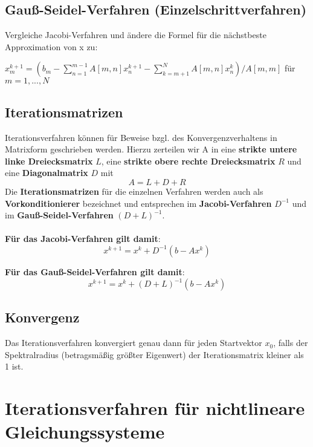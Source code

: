 \documentclass[10pt,a4paper]{article}
\begin{document}
	\subsection{Gauß-Seidel-Verfahren (Einzelschrittverfahren)}
	Vergleiche Jacobi-Verfahren und ändere die Formel für die nächstbeste Approximation von x zu:
	\begin{center}
		$x^{k+1}_m = (b_m - \sum_{n = 1}^{m - 1}A[m, n]x^{k+1}_n - \sum_{k = m + 1}^{N}A[m, n]x_n^k) / A[m, m]$ für $m = 1, ..., N$
	\end{center}
	
	\subsection{Iterationsmatrizen}
	Iterationsverfahren können für Beweise bzgl. des Konvergenzverhaltens in Matrixform geschrieben werden. Hierzu zerteilen wir A in eine \textbf{strikte untere linke Dreiecksmatrix} $L$, eine \textbf{strikte obere rechte Dreiecksmatrix} $R$ und eine \textbf{Diagonalmatrix} $D$ mit $$A = L + D + R$$
	Die \textbf{Iterationsmatrizen} für die einzelnen Verfahren werden auch als \textbf{Vorkonditionierer} bezeichnet und entsprechen im \textbf{Jacobi-Verfahren} $D^{-1}$ und im \textbf{Gauß-Seidel-Verfahren} $(D + L)^{-1}$.\\\\

	\noindent\textbf{Für das Jacobi-Verfahren gilt damit}:
	$$x^{k+1} = x^k + D^{-1}(b - Ax^k)$$

	\noindent\textbf{Für das Gauß-Seidel-Verfahren gilt damit}:
	$$x^{k+1} = x^k + (D + L)^{-1}(b - Ax^k)$$

	\subsection{Konvergenz}
	Das Iterationsverfahren konvergiert genau dann für jeden Startvektor $x_0$, falls der Spektralradius (betragsmäßig größter Eigenwert) der Iterationsmatrix kleiner als 1 ist.

	\newpage
	\section{Iterationsverfahren für nichtlineare Gleichungssysteme}
\end{document}
